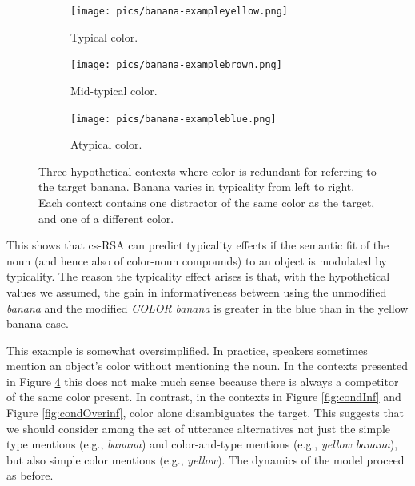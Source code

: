\documentclass[11pt]{article}
\newcommand{\figref}[1]{Figure \ref{#1}}
\begin{document}
\begin{figure}[bt!]
	\begin{subfigure}{.33\textwidth}
		\centering
		\texttt{[image: pics/banana-exampleyellow.png]}
		\caption{Typical color.}
		\label{fig:bananayellow}
	\end{subfigure}
	\begin{subfigure}{.33\textwidth}
		\centering
		\texttt{[image: pics/banana-examplebrown.png]}
		\centering
		\caption{Mid-typical color.}
		\label{fig:bananabrown}
	\end{subfigure}
	\begin{subfigure}{.33\textwidth}
		\centering
		\texttt{[image: pics/banana-exampleblue.png]}
		\caption{Atypical color.}
		\label{fig:bananablue}
	\end{subfigure}
	\caption{Three hypothetical contexts where color is redundant for referring to the target banana. Banana varies in typicality from left to right. Each context contains one distractor of the same color as the target, and one of a different color.}
	\label{fig:bananaexamples}
\end{figure}

This shows that cs-RSA can predict typicality effects if the semantic fit of the noun (and hence also of color-noun compounds) to an object is modulated by typicality. The reason the typicality effect arises is that, with the hypothetical values we assumed, the gain in informativeness between using the unmodified \emph{banana} and the modified \emph{COLOR banana} is greater in the blue than in the yellow banana case. 

This example is somewhat oversimplified. In practice, speakers sometimes mention an object's color without mentioning the noun. In the contexts presented in \figref{fig:bananaexamples} this does not make much sense because there is always a competitor of the same color present. In contrast, in the contexts in \figref{fig:condInf} and \figref{fig:condOverinf}, color alone disambiguates the target. This suggests that we should consider among the set of utterance alternatives not just the simple type mentions (e.g., \emph{banana}) and color-and-type mentions (e.g., \emph{yellow banana}), but also simple color mentions (e.g., \emph{yellow}). The dynamics of the model proceed as before.
\end{document}
